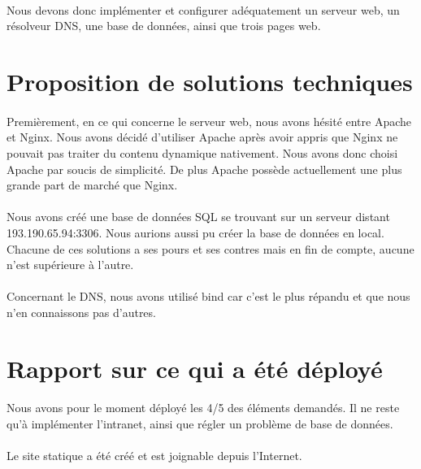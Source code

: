 \documentclass[a4paper,12pt]{article}
\begin{document}
	\paragraph{} Nous devons donc implémenter et configurer adéquatement un serveur web, un résolveur DNS, une base de données, ainsi que trois pages web.
	
	
\section{Proposition de solutions techniques}
	\paragraph{} Premièrement, en ce qui concerne le serveur web, nous avons hésité entre Apache et Nginx. Nous avons décidé d'utiliser Apache après avoir appris que Nginx ne pouvait pas traiter du contenu dynamique nativement. Nous avons donc choisi Apache par soucis de simplicité. De plus Apache possède actuellement une plus grande part de marché que Nginx.
	\paragraph{} Nous avons créé une base de données SQL se trouvant sur un serveur distant 193.190.65.94:3306. Nous aurions aussi pu créer la base de données en local. Chacune de ces solutions a ses pours et ses contres mais en fin de compte, aucune n'est supérieure à l'autre.
	\paragraph{} Concernant le DNS, nous avons utilisé bind car c'est le plus répandu et que nous n'en connaissons pas d'autres.
		
\section{Rapport sur ce qui a été déployé}
	\paragraph{} Nous avons pour le moment déployé les 4/5 des éléments demandés. Il ne reste qu'à implémenter l'intranet, ainsi que régler un problème de base de données.
	\paragraph{} Le site statique a été créé et est joignable depuis l'Internet.
\end{document}
